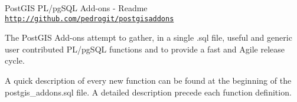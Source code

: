Post\+G\+IS P\+L/pg\+S\+QL Add-\/ons -\/ Readme \href{http://github.com/pedrogit/postgisaddons}{\tt http\+://github.\+com/pedrogit/postgisaddons}

The Post\+G\+IS Add-\/ons attempt to gather, in a single .sql file, useful and generic user contributed P\+L/pg\+S\+QL functions and to provide a fast and Agile release cycle.

A quick description of every new function can be found at the beginning of the postgis\+\_\+addons.\+sql file. A detailed description precede each function definition. 